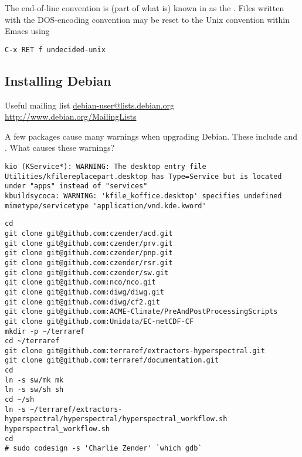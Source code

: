 \documentclass[12pt,twoside]{article}
\begin{document}
The end-of-line convention is (part of what is) known in
 as the .
Files written with the DOS-encoding convention may be reset to the
Unix convention within Emacs using
\begin{verbatim}
C-x RET f undecided-unix
\end{verbatim}

\subsection{Installing Debian}\label{sxn:dbn_nst}
Useful mailing list \url{debian-user@lists.debian.org}
\url{http://www.debian.org/MailingLists}

A few packages cause many warnings when upgrading Debian. 
These include  and .
What causes these warnings?
\begin{verbatim}
kio (KService*): WARNING: The desktop entry file Utilities/kfilereplacepart.desktop has Type=Service but is located under "apps" instead of "services"
kbuildsycoca: WARNING: 'kfile_koffice.desktop' specifies undefined mimetype/servicetype 'application/vnd.kde.kword'
\end{verbatim}

\begin{verbatim}
cd
git clone git@github.com:czender/acd.git
git clone git@github.com:czender/prv.git
git clone git@github.com:czender/pnp.git
git clone git@github.com:czender/rsr.git
git clone git@github.com:czender/sw.git
git clone git@github.com:nco/nco.git
git clone git@github.com:diwg/diwg.git
git clone git@github.com:diwg/cf2.git
git clone git@github.com:ACME-Climate/PreAndPostProcessingScripts
git clone git@github.com:Unidata/EC-netCDF-CF
mkdir -p ~/terraref
cd ~/terraref
git clone git@github.com:terraref/extractors-hyperspectral.git
git clone git@github.com:terraref/documentation.git
cd
ln -s sw/mk mk
ln -s sw/sh sh
cd ~/sh
ln -s ~/terraref/extractors-hyperspectral/hyperspectral/hyperspectral_workflow.sh hyperspectral_workflow.sh
cd
# sudo codesign -s 'Charlie Zender' `which gdb`
\end{verbatim}
\end{document}
